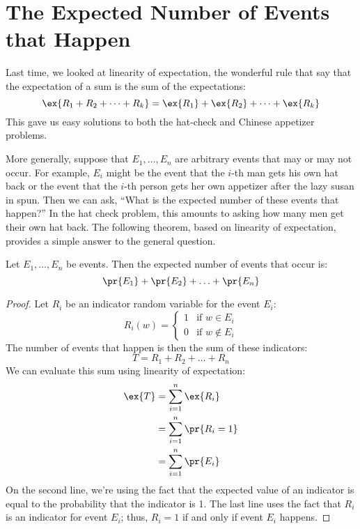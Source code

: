 \documentclass[12pt,twoside]{article}
\begin{document}

\section{The Expected Number of Events that Happen}

Last time, we looked at linearity of expectation, the wonderful rule
that say that the expectation of a sum is the sum of the expectations:
%
\[
\ex{R_1 + R_2 + \cdots + R_k} = \ex{R_1} + \ex{R_2} + \cdots + \ex{R_k}
\]
%
This gave us easy solutions to both the hat-check and Chinese
appetizer problems.

More generally, suppose that $E_1, \ldots, E_n$ are arbitrary events
that may or may not occur.  For example, $E_i$ might be the event that
the $i$-th man gets his own hat back or the event that the $i$-th
person gets her own appetizer after the lazy susan in spun.  Then we
can ask, ``What is the expected number of these events that happen?''
In the hat check problem, this amounts to asking how many men get
their own hat back.  The following theorem, based on linearity of
expectation, provides a simple answer to the general question.

\begin{theorem}
Let $E_1, \ldots, E_n$ be events.  Then the expected number of events
that occur is:
%
\[
\pr{E_1} + \pr{E_2} + \ldots + \pr{E_n}
\]
\end{theorem}

\begin{proof}
Let $R_i$ be an indicator random variable for the event $E_i$:
%
\[
R_i(w) =
\begin{cases}
1 & \text{if $w \in E_i$} \\
0 & \text{if $w \not\in E_i$}
\end{cases}
\]
%
The number of events that happen is then the sum of these indicators:
%
\[
T = R_1 + R_2 + \ldots + R_n
\]
%
We can evaluate this sum using linearity of expectation:
%
\begin{align*}
\ex{T}
    & = \sum_{i=1}^n \ex{R_i} \\
    & = \sum_{i=1}^n \pr{R_i = 1} \\
    & = \sum_{i=1}^n \pr{E_i}
\end{align*}
%
On the second line, we're using the fact that the expected value of an
indicator is equal to the probability that the indicator is 1.  The
last line uses the fact that $R_i$ is an indicator for event $E_i$;
thus, $R_i = 1$ if and only if event $E_i$ happens.
\end{proof}
\end{document}
